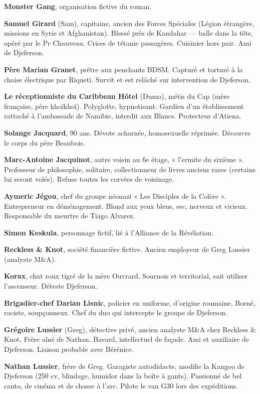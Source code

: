 \textbf{Monster Gang}, organisation fictive du roman.

\textbf{Samuel Girard} (Sam), capitaine, ancien des Forces Spéciales (Légion étrangère, missions en Syrie et Afghanistan). Blessé près de Kandahar --- balle dans la tête, opéré par le Pr Chauveau. Crises de tétanie passagères. Cuisinier hors pair. Ami de Djeferson.

\textbf{Père Marian Granet}, prêtre aux penchants BDSM. Capturé et torturé à la chaise électrique par Riqueti. Survit et est relâché sur intervention de Djeferson.

\textbf{Le réceptionniste du Caribbean Hôtel} (Dumo), métis du Cap (mère française, père khoïkhoï). Polyglotte, hypnotisant. Gardien d'un établissement rattaché à l'ambassade de Namibie, interdit aux Blancs. Protecteur d'Atiena.

\textbf{Solange Jacquard}, 90 ans. Dévote acharnée, homosexuelle réprimée. Découvre le corps du père Beaubois.

\textbf{Marc-Antoine Jacquinot}, autre voisin au 6e étage, « l'ermite du sixième ». Professeur de philosophie, solitaire, collectionneur de livres anciens rares (certains lui seront volés). Refuse toutes les corvées de voisinage.

\textbf{Aymeric Jégou}, chef du groupe néonazi « Les Disciples de la Colère ». Entrepreneur en déménagement. Blond aux yeux bleus, sec, nerveux et vicieux. Responsable du meurtre de Tiago Alvarez.

\textbf{Simon Keskula}, personnage fictif, lié à l'Alliance de la Révélation.

\textbf{Reckless \& Knot}, société financière fictive. Ancien employeur de Greg Lussier (analyste M\&A).

\textbf{Korax}, chat roux tigré de la mère Ouvrard. Sournois et territorial, sait utiliser l'ascenseur. Déteste Djeferson.

\textbf{Brigadier-chef Darian Lisnic}, policier en uniforme, d'origine roumaine. Borné, raciste, soupçonneux. Chef du duo qui intercepte le groupe de Djeferson.

\textbf{Grégoire Lussier} (Greg), détective privé, ancien analyste M\&A chez Reckless \& Knot. Frère aîné de Nathan. Bavard, intellectuel de façade. Ami et auxiliaire de Djeferson. Liaison probable avec Bérénice.

\textbf{Nathan Lussier}, frère de Greg. Garagiste autodidacte, modifie la Kangoo de Djeferson (250 cv, blindage, humidor dans la boîte à gants). Passionné de bel canto, de cinéma et de chasse à l'arc. Pilote le van G30 lors des expéditions.

